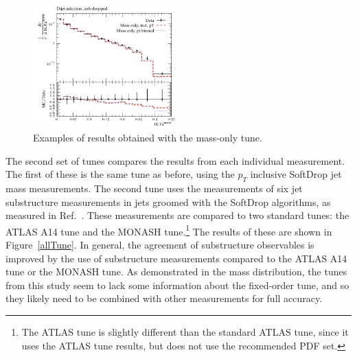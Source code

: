 \begin{figure}
\begin{center}
\includegraphics[width=0.49\textwidth]{figs/RivetPlotsMassOnly/ATLAS_2019_I1724098/d27-x01-y01.pdf} \hfill
\end{center}
\caption{Examples of results obtained with the mass-only tune.}
\label{massOnlyTune}
\end{figure}


The second set of tunes compares the results from each individual measurement. The first of these is the same tune as before, using the $p_T$ inclusive SoftDrop jet mass measurements.
The second tune uses the measurements of six jet substructure measurements in jets groomed with the SoftDrop algorithms, as measured in Ref.~\cite{Aaboud:2019aii}.
These measurements are compared to two standard tunes: the ATLAS A14 tune and the MONASH tune.\footnote{The ATLAS tune is slightly different than the standard ATLAS tune, since it uses the ATLAS tune results, but does not use the recommended PDF set.}
The results of these are shown in Figure~\ref{allTune}. 
In general, the agreement of substructure observables is improved by the use of substructure measurements compared to the ATLAS A14 tune or the MONASH tune.
As demonstrated in the mass distribution, the tunes from this study seem to lack some information about the fixed-order tune, 
and so they likely need to be combined with other measurements for full accuracy. 


